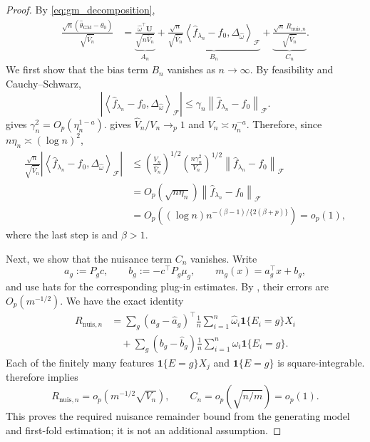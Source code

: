 \documentclass[11pt]{article}
\newcommand{\F}{\mathcal{F}}
\newcommand{\inner}[2]{\left\langle #1,#2\right\rangle}
\newcommand{\norm}[1]{\left\lVert #1\right\rVert}
\newcommand{\abs}[1]{\left\lvert #1\right\rvert}
\begin{document}
\begin{proof}
By \eqref{eq:gm_decomposition},
\begin{align}
 \frac{\sqrt n(\widehat\theta_{\mathrm{GM}}-\theta_0)}{\sqrt{\widehat V_n}}
 &=\underbrace{\frac{\widehat\omega^\top\bm U}{\sqrt{n\widehat V_n}}}_{A_n}
 +\underbrace{\frac{\sqrt n}{\sqrt{\widehat V_n}}
   \inner{\widehat f_{\lambda_n}-f_0}{\Delta_{\widehat\omega}}_{\F}}_{B_n}
 +\underbrace{\frac{\sqrt n\,R_{\mathrm{nuis},n}}{\sqrt{\widehat V_n}}}_{C_n}.
 \label{eq:clt_decomposition}
\end{align}
We first show that the bias term $B_n$ vanishes as $n\to\infty$. By feasibility and Cauchy--Schwarz,
\[
 \abs{\inner{\widehat f_{\lambda_n}-f_0}{\Delta_{\widehat\omega}}_{\F}}
 \leq\gamma_n\norm{\widehat f_{\lambda_n}-f_0}_{\F}.
\]
 gives $\gamma_n^2=O_p(\eta_n^{1-a})$.
 gives $\widehat V_n/V_n\to_p1$ and $V_n\asymp\eta_n^{-a}$. Therefore, since $n\eta_n\asymp(\log n)^2$,
\begin{align*}
 \frac{\sqrt n}{\sqrt{\widehat V_n}}
 \abs{\inner{\widehat f_{\lambda_n}-f_0}{\Delta_{\widehat\omega}}_{\F}}
 &\leq\left(\frac{V_n}{\widehat V_n}\right)^{1/2}
 \left(\frac{n\gamma_n^2}{V_n}\right)^{1/2}\norm{\widehat f_{\lambda_n}-f_0}_{\F}\\
 &=O_p(\sqrt{n\eta_n})\norm{\widehat f_{\lambda_n}-f_0}_{\F}\\
 &=O_p\!\left((\log n)n^{-(\beta-1)/\{2(\beta+p)\}}\right)=o_p(1),
\end{align*}
where the last step is  and $\beta>1$.

Next, we show that the nuisance term $C_n$ vanishes. Write
\[
 a_g:=P_gc,\qquad b_g:=-c^\top P_g\mu_g,
 \qquad m_g(x)=a_g^\top x+b_g,
\]
and use hats for the corresponding plug-in estimates. By , their errors are $O_p(m^{-1/2})$. We have the exact identity
\begin{align*}
 R_{\mathrm{nuis},n}
 &=\sum_g(a_g-\widehat a_g)^\top
 \frac1n\sum_{i=1}^n\widehat\omega_i\mathbf1\{E_i=g\}X_i\\
 &\quad+\sum_g(b_g-\widehat b_g)
 \frac1n\sum_{i=1}^n\widehat\omega_i\mathbf1\{E_i=g\}.
\end{align*}
Each of the finitely many features $\mathbf1\{E=g\}X_j$ and $\mathbf1\{E=g\}$ is square-integrable.  therefore implies
\[
 R_{\mathrm{nuis},n}=o_p\!\left(m^{-1/2}\sqrt{V_n}\right),\qquad
 C_n=o_p\!\left(\sqrt{n/m}\right)=o_p(1).
\]
This proves the required nuisance remainder bound from the generating model and first-fold estimation; it is not an additional assumption.


\end{proof}
\end{document}
